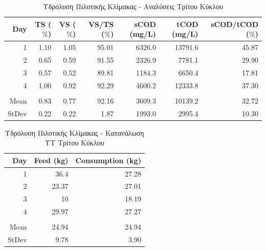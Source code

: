 \documentclass[11pt]{report}
\begin{document}
\begin{table}[htbp]
\caption{\label{tab:org4a0564a}Υδρόλυση Πιλοτικής Κλίμακας - Αναλύσεις Τρίτου Κύκλου}
\centering
\begin{tabular}{rrrrrrr}
Day & TS (\(\%\)) & VS (\(\%\)) & VS/TS (\(\%\)) & sCOD (mg/L) & tCOD (mg/L) & sCOD/tCOD (\(\%\))\\[0pt]
\hline
1 & 1.10 & 1.05 & 95.01 & 6326.0 & 13791.6 & 45.87\\[0pt]
2 & 0.65 & 0.59 & 91.55 & 2326.9 & 7781.1 & 29.90\\[0pt]
3 & 0.57 & 0.52 & 89.81 & 1184.3 & 6650.4 & 17.81\\[0pt]
4 & 1.00 & 0.92 & 92.29 & 4600.2 & 12333.8 & 37.30\\[0pt]
 &  &  &  &  &  & \\[0pt]
Mean & 0.83 & 0.77 & 92.16 & 3609.3 & 10139.2 & 32.72\\[0pt]
StDev & 0.22 & 0.22 & 1.87 & 1993.0 & 2995.4 & 10.30\\[0pt]
\end{tabular}
\end{table}

\begin{table}[htbp]
\caption{\label{tab:org0908f68}Υδρόλυση Πιλοτικής Κλίμακας - Κατανάλωση ΥΤ Τρίτου Κύκλου}
\centering
\begin{tabular}{rrr}
Day & Feed (kg) & Consumption (kg)\\[0pt]
\hline
1 & 36.4 & 27.28\\[0pt]
2 & 23.37 & 27.01\\[0pt]
3 & 10 & 18.19\\[0pt]
4 & 29.97 & 27.27\\[0pt]
 &  & \\[0pt]
Mean & 24.94 & 24.94\\[0pt]
StDev & 9.78 & 3.90\\[0pt]
\end{tabular}
\end{table}
\end{document}
